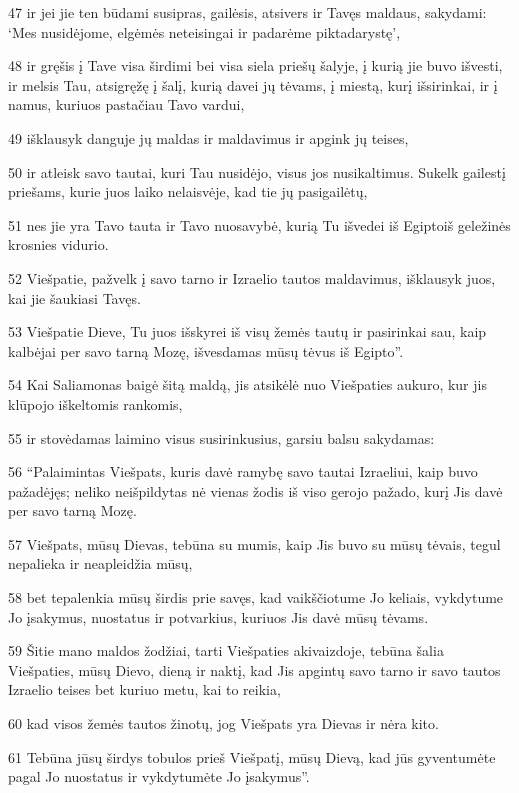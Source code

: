 \par 47 ir jei jie ten būdami susipras, gailėsis, atsivers ir Tavęs maldaus, sakydami: ‘Mes nusidėjome, elgėmės neteisingai ir padarėme piktadarystę’, 
\par 48 ir gręšis į Tave visa širdimi bei visa siela priešų šalyje, į kurią jie buvo išvesti, ir melsis Tau, atsigręžę į šalį, kurią davei jų tėvams, į miestą, kurį išsirinkai, ir į namus, kuriuos pastačiau Tavo vardui, 
\par 49 išklausyk danguje jų maldas ir maldavimus ir apgink jų teises, 
\par 50 ir atleisk savo tautai, kuri Tau nusidėjo, visus jos nusikaltimus. Sukelk gailestį priešams, kurie juos laiko nelaisvėje, kad tie jų pasigailėtų, 
\par 51 nes jie yra Tavo tauta ir Tavo nuosavybė, kurią Tu išvedei iš Egipto­iš geležinės krosnies vidurio. 
\par 52 Viešpatie, pažvelk į savo tarno ir Izraelio tautos maldavimus, išklausyk juos, kai jie šaukiasi Tavęs. 
\par 53 Viešpatie Dieve, Tu juos išskyrei iš visų žemės tautų ir pasirinkai sau, kaip kalbėjai per savo tarną Mozę, išvesdamas mūsų tėvus iš Egipto”. 
\par 54 Kai Saliamonas baigė šitą maldą, jis atsikėlė nuo Viešpaties aukuro, kur jis klūpojo iškeltomis rankomis, 
\par 55 ir stovėdamas laimino visus susirinkusius, garsiu balsu sakydamas: 
\par 56 “Palaimintas Viešpats, kuris davė ramybę savo tautai Izraeliui, kaip buvo pažadėjęs; neliko neišpildytas nė vienas žodis iš viso gerojo pažado, kurį Jis davė per savo tarną Mozę. 
\par 57 Viešpats, mūsų Dievas, tebūna su mumis, kaip Jis buvo su mūsų tėvais, tegul nepalieka ir neapleidžia mūsų, 
\par 58 bet tepalenkia mūsų širdis prie savęs, kad vaikščiotume Jo keliais, vykdytume Jo įsakymus, nuostatus ir potvarkius, kuriuos Jis davė mūsų tėvams. 
\par 59 Šitie mano maldos žodžiai, tarti Viešpaties akivaizdoje, tebūna šalia Viešpaties, mūsų Dievo, dieną ir naktį, kad Jis apgintų savo tarno ir savo tautos Izraelio teises bet kuriuo metu, kai to reikia, 
\par 60 kad visos žemės tautos žinotų, jog Viešpats yra Dievas ir nėra kito. 
\par 61 Tebūna jūsų širdys tobulos prieš Viešpatį, mūsų Dievą, kad jūs gyventumėte pagal Jo nuostatus ir vykdytumėte Jo įsakymus”. 
